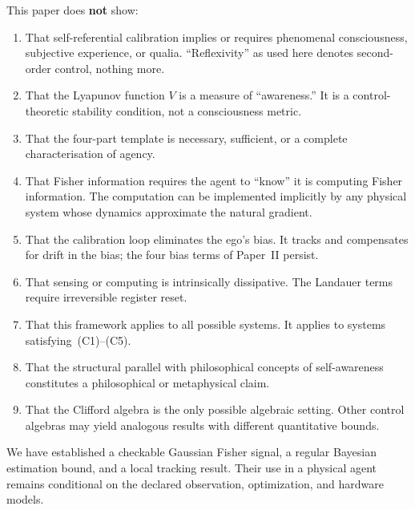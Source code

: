 \documentclass[12pt]{article}
\begin{document}
\medskip
This paper does \textbf{not} show:
\begin{enumerate}
\item That self-referential calibration implies or requires
  phenomenal consciousness, subjective experience, or
  qualia. ``Reflexivity'' as used here denotes
  second-order control, nothing more.
\item That the Lyapunov function $V$ is a measure of
  ``awareness.'' It is a control-theoretic stability
  condition, not a consciousness metric.
\item That the four-part template is necessary, sufficient, or a
  complete characterisation of agency.
\item That Fisher information requires the agent to
  ``know'' it is computing Fisher information.
  The computation can be implemented implicitly by any
  physical system whose dynamics approximate the natural
  gradient.
\item That the calibration loop eliminates the ego's bias.
  It tracks and compensates for drift in the bias;
  the four bias terms of Paper~II persist.
\item That sensing or computing is intrinsically dissipative.  The
  Landauer terms require irreversible register reset.
\item That this framework applies to all possible systems.
  It applies to systems satisfying~(C1)--(C5).
\item That the structural parallel with philosophical
  concepts of self-awareness constitutes a philosophical
  or metaphysical claim.
\item That the Clifford algebra is the only possible
  algebraic setting. Other control algebras may yield
  analogous results with different quantitative bounds.
\end{enumerate}

\medskip
We have established a checkable Gaussian Fisher signal, a regular
Bayesian estimation bound, and a local tracking result.  Their use in a
physical agent remains conditional on the declared observation,
optimization, and hardware models.
\end{document}
